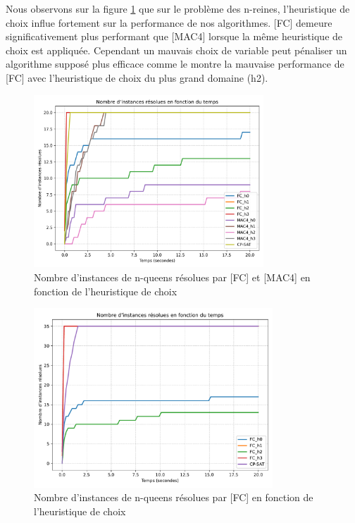 \documentclass[14pt]{article}
\begin{document}
Nous observons sur la figure \ref{fig:n-queens-h1} que sur le problème des n-reines, l'heuristique de choix influe fortement sur la performance de nos algorithmes. [FC] demeure significativement plus performant que [MAC4] lorsque la même heuristique de choix est appliquée. Cependant un mauvais choix de variable peut pénaliser un algorithme supposé plus efficace comme le montre la mauvaise performance de [FC] avec l'heuristique de choix du plus grand domaine (h2).

\begin{figure}[H]
	\centering
	\includegraphics[width=0.77\textwidth]{Images/n-queens-h-MAC-FC.png}
	\caption{Nombre d'instances de n-queens résolues par [FC] et [MAC4] en fonction de l'heuristique de choix}
	\label{fig:n-queens-h1}
\end{figure}

\begin{figure}[H]
	\centering
	\includegraphics[width=0.8\textwidth]{Images/n-queens-h-FC.pdf}
	\caption{Nombre d'instances de n-queens résolues par [FC] en fonction de l'heuristique de choix}
	\label{fig:n-queens-h2}
\end{figure}
\end{document}
